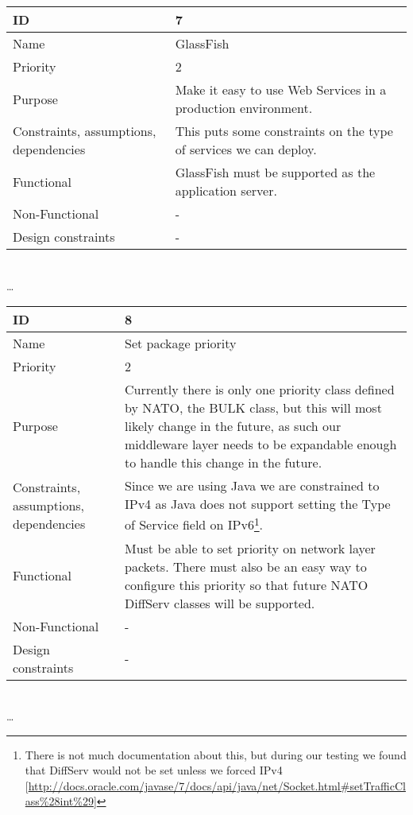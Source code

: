 \begin{center}
	\begin{tabular}{| p{4cm} | p{8cm} |}
		\hline
		ID & 7 \\
		\hline
		Name & GlassFish \\
		\hline
		Priority & 2 \\
		\hline
		Purpose & Make it easy to use Web Services in a production environment. \\
		\hline 
		Constraints, assumptions, dependencies & This puts some constraints on the type of services we can deploy. \\
		\hline  
		Functional & GlassFish must be supported as the application server.  \\
		\hline
		Non-Functional & - \\ 
		\hline
		Design constraints & - \\
		\hline
	\end{tabular}
	\\  \ldots  \\

	\begin{tabular}{| p{4cm} | p{8cm} |}
		\hline
		ID & 8 \\
		\hline
		Name & Set package priority \\
		\hline
		Priority & 2 \\
		\hline
		Purpose & Currently there is only one priority class defined by NATO, the BULK class, but this will most likely change in the future, as such our middleware layer needs to be expandable enough to handle this change in the future. \\
		\hline 
		Constraints, assumptions, dependencies & Since we are using Java we are constrained to IPv4 as Java does not support setting the Type of Service field on IPv6\footnote{There is not much documentation about this, but during our testing we found that DiffServ would not be set unless we forced IPv4 [\url{http://docs.oracle.com/javase/7/docs/api/java/net/Socket.html#setTrafficClass\%28int\%29}]}.\\
		\hline  
		Functional & Must be able to set priority on network layer packets. There must also be an easy way to configure this priority so that future NATO DiffServ classes will be supported. \\
		\hline
		Non-Functional & -\\ 
		\hline
		Design constraints & - \\
		\hline
	\end{tabular}
	\\  \ldots  \\


\end{center}
